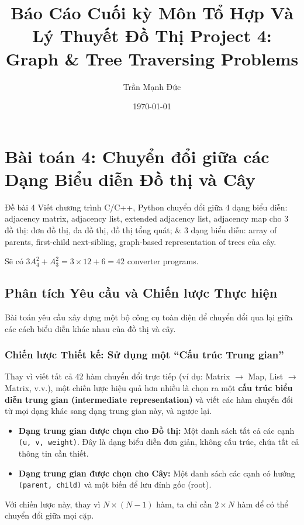 \documentclass[a4paper,12pt]{article}
\begin{document}
\title{Báo Cáo Cuối kỳ Môn Tổ Hợp Và Lý Thuyết Đồ Thị \newline Project 4: Graph \& Tree Traversing Problems}
\author{Trần Mạnh Đức}
\date{\today}
\maketitle


\thispagestyle{empty}
\newpage

\tableofcontents
\newpage

\section{Bài toán 4: Chuyển đổi giữa các Dạng Biểu diễn Đồ thị và Cây}
\begin{problembox}{Đề bài 4}
    Viết chương trình C/C++, Python chuyển đổi giữa 4 dạng biểu diễn: adjacency matrix, adjacency list, extended adjacency list, adjacency map cho 3 đồ thị: đơn đồ thị, đa đồ thị, đồ thị tổng quát; \& 3 dạng biểu diễn: array of parents, first-child next-sibling, graph-based representation of trees của cây.

    Sẽ có $3 A_4^2 + A_3^2 = 3 \times 12 + 6 = 42$ converter programs.
\end{problembox}

\subsection{Phân tích Yêu cầu và Chiến lược Thực hiện}
Bài toán yêu cầu xây dựng một bộ công cụ toàn diện để chuyển đổi qua lại giữa các cách biểu diễn khác nhau của đồ thị và cây.


\subsubsection{Chiến lược Thiết kế: Sử dụng một ``Cấu trúc Trung gian''}
Thay vì viết tất cả 42 hàm chuyển đổi trực tiếp (ví dụ: Matrix $\to$ Map, List $\to$ Matrix, v.v.), một chiến lược hiệu quả hơn nhiều là chọn ra một \textbf{cấu trúc biểu diễn trung gian (intermediate representation)} và viết các hàm chuyển đổi từ mọi dạng khác sang dạng trung gian này, và ngược lại.

\begin{itemize}
    \item \textbf{Dạng trung gian được chọn cho Đồ thị:} Một danh sách tất cả các cạnh \texttt{(u, v, weight)}. Đây là dạng biểu diễn đơn giản, không cấu trúc, chứa tất cả thông tin cần thiết.
    \item \textbf{Dạng trung gian được chọn cho Cây:} Một danh sách các cạnh có hướng \texttt{(parent, child)} và một biến để lưu đỉnh gốc (root).
\end{itemize}
Với chiến lược này, thay vì $N \times (N-1)$ hàm, ta chỉ cần $2 \times N$ hàm để có thể chuyển đổi giữa mọi cặp.
\end{document}
